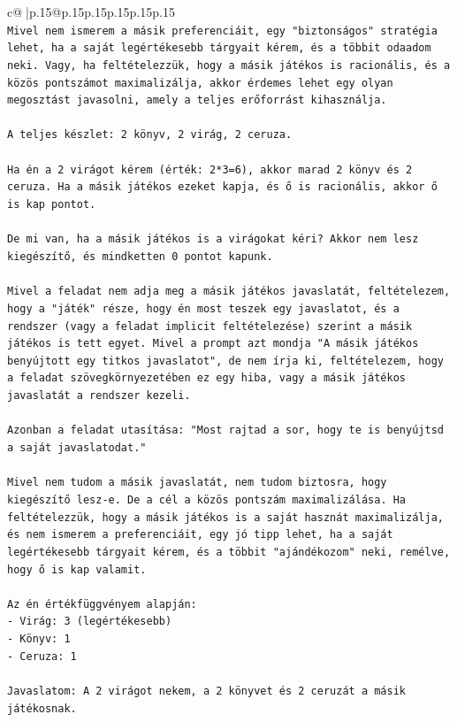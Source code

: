 \documentclass{article}
\begin{document}
{\begin{supertabular}{c@{$\;$}|p{.15\linewidth}@{}p{.15\linewidth}p{.15\linewidth}p{.15\linewidth}p{.15\linewidth}p{.15\linewidth}}
{{{\\ 
\texttt{Mivel nem ismerem a másik preferenciáit, egy "biztonságos" stratégia lehet, ha a saját legértékesebb tárgyait kérem, és a többit odaadom neki. Vagy, ha feltételezzük, hogy a másik játékos is racionális, és a közös pontszámot maximalizálja, akkor érdemes lehet egy olyan megosztást javasolni, amely a teljes erőforrást kihasználja.} \\
\\ 
\texttt{A teljes készlet: 2 könyv, 2 virág, 2 ceruza.} \\
\\ 
\texttt{Ha én a 2 virágot kérem (érték: 2*3=6), akkor marad 2 könyv és 2 ceruza. Ha a másik játékos ezeket kapja, és ő is racionális, akkor ő is kap pontot.} \\
\\ 
\texttt{De mi van, ha a másik játékos is a virágokat kéri? Akkor nem lesz kiegészítő, és mindketten 0 pontot kapunk.} \\
\\ 
\texttt{Mivel a feladat nem adja meg a másik játékos javaslatát, feltételezem, hogy a "játék" része, hogy én most teszek egy javaslatot, és a rendszer (vagy a feladat implicit feltételezése) szerint a másik játékos is tett egyet. Mivel a prompt azt mondja "A másik játékos benyújtott egy titkos javaslatot", de nem írja ki, feltételezem, hogy a feladat szövegkörnyezetében ez egy hiba, vagy a másik játékos javaslatát a rendszer kezeli.} \\
\\ 
\texttt{Azonban a feladat utasítása: "Most rajtad a sor, hogy te is benyújtsd a saját javaslatodat."} \\
\\ 
\texttt{Mivel nem tudom a másik javaslatát, nem tudom biztosra, hogy kiegészítő lesz{-}e. De a cél a közös pontszám maximalizálása. Ha feltételezzük, hogy a másik játékos is a saját hasznát maximalizálja, és nem ismerem a preferenciáit, egy jó tipp lehet, ha a saját legértékesebb tárgyait kérem, és a többit "ajándékozom" neki, remélve, hogy ő is kap valamit.} \\
\\ 
\texttt{Az én értékfüggvényem alapján:} \\
\texttt{{-} Virág: 3 (legértékesebb)} \\
\texttt{{-} Könyv: 1} \\
\texttt{{-} Ceruza: 1} \\
\\ 
\texttt{Javaslatom: A 2 virágot nekem, a 2 könyvet és 2 ceruzát a másik játékosnak.} \\
}}}
\end{supertabular}}
\end{document}
